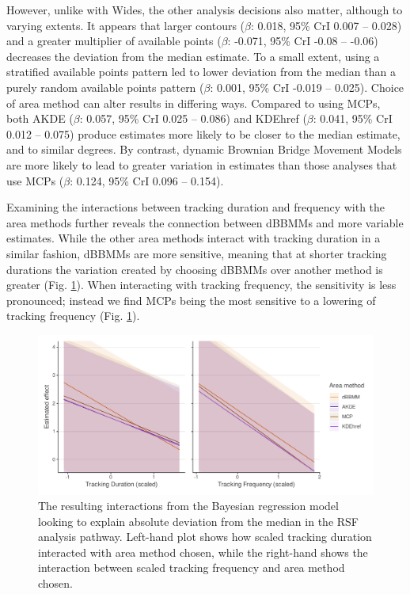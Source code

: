 \documentclass[10pt,a4paper]{article}
\begin{document}
However, unlike with Wides, the other analysis decisions also matter, although to varying extents.
It appears that larger contours (\(\beta\): 0.018, 95\% CrI 0.007 -- 0.028) and a greater multiplier of available points (\(\beta\): -0.071, 95\% CrI -0.08 -- -0.06) decreases the deviation from the median estimate.
To a small extent, using a stratified available points pattern led to lower deviation from the median than a purely random available points pattern (\(\beta\): 0.001, 95\% CrI -0.019 -- 0.025).
Choice of area method can alter results in differing ways.
Compared to using MCPs, both AKDE (\(\beta\): 0.057, 95\% CrI 0.025 -- 0.086) and KDEhref (\(\beta\): 0.041, 95\% CrI 0.012 -- 0.075) produce estimates more likely to be closer to the median estimate, and to similar degrees.
By contrast, dynamic Brownian Bridge Movement Models are more likely to lead to greater variation in estimates than those analyses that use MCPs (\(\beta\): 0.124, 95\% CrI 0.096 -- 0.154).

Examining the interactions between tracking duration and frequency with the area methods further reveals the connection between dBBMMs and more variable estimates.
While the other area methods interact with tracking duration in a similar fashion, dBBMMs are more sensitive, meaning that at shorter tracking durations the variation created by choosing dBBMMs over another method is greater (Fig. \ref{fig:rsfInteractions}).
When interacting with tracking frequency, the sensitivity is less pronounced; instead we find MCPs being the most sensitive to a lowering of tracking frequency (Fig. \ref{fig:rsfInteractions}).

\begin{figure}
\includegraphics[width=1\linewidth]{../figures/rsfEffectPlot_iteractions} \caption{The resulting interactions from the Bayesian regression model looking to explain absolute deviation from the median in the RSF analysis pathway. Left-hand plot shows how scaled tracking duration interacted with area method chosen, while the right-hand shows the interaction between scaled tracking frequency and area method chosen.}\label{fig:rsfInteractions}
\end{figure}
\end{document}

